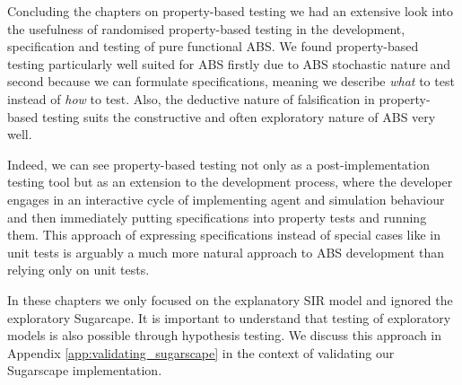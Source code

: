 \medskip

Concluding the chapters on property-based testing we had an extensive look into the usefulness of randomised property-based testing in the development, specification and testing of pure functional ABS. We found property-based testing particularly well suited for ABS firstly due to ABS stochastic nature and second because we can formulate specifications, meaning we describe \textit{what} to test instead of \textit{how} to test. Also, the deductive nature of falsification in property-based testing suits the constructive and often exploratory nature of ABS very well. 

Indeed, we can see property-based testing not only as a post-implementation testing tool but as an extension to the development process, where the developer engages in an interactive cycle of implementing agent and simulation behaviour and then immediately putting specifications into property tests and running them. This approach of expressing specifications instead of special cases like in unit tests is arguably a much more natural approach to ABS development than relying only on unit tests.

In these chapters we only focused on the explanatory SIR model and ignored the exploratory Sugarcape. It is important to understand that testing of exploratory models is also possible through hypothesis testing. We discuss this approach in Appendix \ref{app:validating_sugarscape} in the context of validating our Sugarscape implementation.